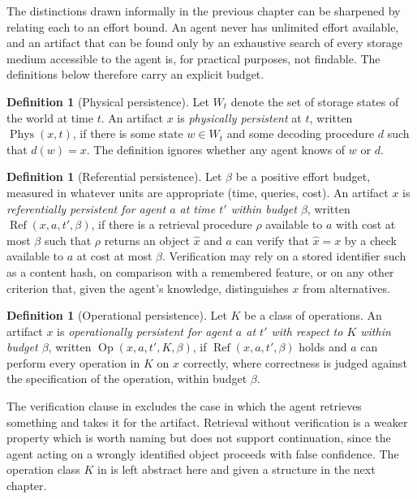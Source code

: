 \documentclass[11pt,twoside,openright]{book}
\theoremstyle{plain}
\theoremstyle{definition}
\newtheorem{definition}[theorem]{Definition}
\theoremstyle{remark}
\newcommand{\Phys}{\operatorname{Phys}}
\newcommand{\Refp}{\operatorname{Ref}}
\newcommand{\Oper}{\operatorname{Op}}
\begin{document}
The distinctions drawn informally in the previous chapter can be sharpened by relating each to an effort bound. An agent never has unlimited effort available, and an artifact that can be found only by an exhaustive search of every storage medium accessible to the agent is, for practical purposes, not findable. The definitions below therefore carry an explicit budget.

\begin{definition}[Physical persistence]\label{def:phys}
Let $W_t$ denote the set of storage states of the world at time $t$. An artifact $x$ is \emph{physically persistent} at $t$, written $\Phys(x,t)$, if there is some state $w\in W_t$ and some decoding procedure $d$ such that $d(w)=x$. The definition ignores whether any agent knows of $w$ or $d$.
\end{definition}

\begin{definition}[Referential persistence]\label{def:ref}
Let $\beta$ be a positive effort budget, measured in whatever units are appropriate (time, queries, cost). An artifact $x$ is \emph{referentially persistent for agent $a$ at time $t'$ within budget $\beta$}, written $\Refp(x,a,t',\beta)$, if there is a retrieval procedure $\rho$ available to $a$ with cost at most $\beta$ such that $\rho$ returns an object $\hat{x}$ and $a$ can verify that $\hat{x}=x$ by a check available to $a$ at cost at most $\beta$. Verification may rely on a stored identifier such as a content hash, on comparison with a remembered feature, or on any other criterion that, given the agent's knowledge, distinguishes $x$ from alternatives.
\end{definition}

\begin{definition}[Operational persistence]\label{def:oper}
Let $K$ be a class of operations. An artifact $x$ is \emph{operationally persistent for agent $a$ at $t'$ with respect to $K$ within budget $\beta$}, written $\Oper(x,a,t',K,\beta)$, if $\Refp(x,a,t',\beta)$ holds and $a$ can perform every operation in $K$ on $x$ correctly, where correctness is judged against the specification of the operation, within budget $\beta$.
\end{definition}

The verification clause in  excludes the case in which the agent retrieves something and takes it for the artifact. Retrieval without verification is a weaker property which is worth naming but does not support continuation, since the agent acting on a wrongly identified object proceeds with false confidence. The operation class $K$ in  is left abstract here and given a structure in the next chapter.
\end{document}
